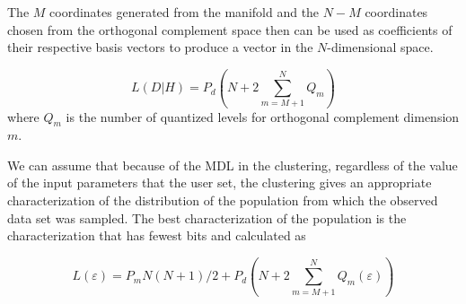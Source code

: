 The $M$ coordinates generated from the manifold and the $N-M$ coordinates chosen
from the orthogonal complement space then can be used as coefficients of their
respective basis vectors to produce a vector in the $N$-dimensional space.


\begin{equation} \label{eq:mdl-lmc-data-pop}
L(D|H) = P_d \left(N+2\sum_{m=M+1}^N Q_{m} \right)
\end{equation}
where $Q_m$ is the number of quantized levels for orthogonal complement
dimension $m$.

We can assume that because of the MDL in the clustering, regardless of
the value of the input parameters that the user set, the clustering gives an
appropriate characterization of the distribution of the population from which
the observed data set was sampled. The best characterization of the population
is the characterization that has fewest bits and calculated as

\begin{equation} \label{eq:mdl-lmc-final-pop}
L(\varepsilon) = P_m N(N+1)/2 + P_d \left(N+2\sum_{m=M+1}^N Q_{m}(\varepsilon) \right)
\end{equation}
